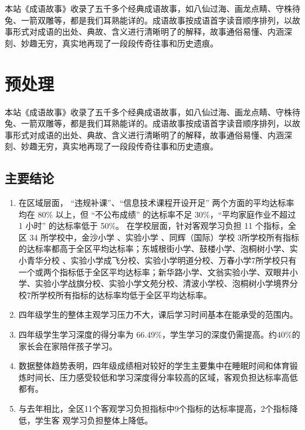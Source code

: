 \documentclass[hyperref, a4paper, UTF8, zihao = -4, linespread = 1]{ctexbook}
\begin{document}
本站《成语故事》收录了五千多个经典成语故事，如八仙过海、画龙点睛、守株待兔、一箭双雕等，都是我们耳熟能详的。成语故事按成语首字读音顺序排列，以故事形式对成语的出处、典故、含义进行清晰明了的解释，故事通俗易懂、内涵深刻、妙趣无穷，真实地再现了一段段传奇往事和历史遗痕。

\hypertarget{preprocess}{%
\chapter{预处理}\label{preprocess}}

本站《成语故事》收录了五千多个经典成语故事，如八仙过海、画龙点睛、守株待兔、一箭双雕等，都是我们耳熟能详的。成语故事按成语首字读音顺序排列，以故事形式对成语的出处、典故、含义进行清晰明了的解释，故事通俗易懂、内涵深刻、妙趣无穷，真实地再现了一段段传奇往事和历史遗痕。

\hypertarget{ux4e3bux8981ux7ed3ux8bba}{%
\section{主要结论}\label{ux4e3bux8981ux7ed3ux8bba}}

\begin{enumerate}
\def\labelenumi{\arabic{enumi}.}
\item
  在区域层面， ``违规补课''、``信息技术课程开设开足'' 两个方面的平均达标率均在 80\% 以上，但 ``不公布成绩'' 的达标率不足 30\%，``平均家庭作业不超过 1 小时'' 的达标率低于 50\%。 在学校层面，针对客观学习负担 11 个指标，全区 34 所学校中，金沙小学 、实验小学 、同辉（国际）学校 3所学校所有指标的达标率都高于全区平均达标率；东城根街小学、鼓楼小学、泡桐树小学、实小青华分校 、实验小学成飞分校、实验小学明道分校、万春小学7所学校只有一个或两个指标低于全区平均达标率；新华路小学、文翁实验小学、双眼井小学、实验小学战旗分校、实验小学文苑分校、清波小学校、泡桐树小学境界分校7所学校所有指标的达标率均低于全区平均达标率。
\item
  四年级学生的整体主观学习压力不大，课后学习时间基本在能承受的范围内。
\item
  四年级学生学习深度的得分率为 66.49\%，学生学习的深度仍需提高。约40\%的家长会在家陪伴孩子学习。
\item
  数据整体趋势表明，四年级成绩相对较好的学生主要集中在睡眠时间和体育锻炼时间长、压力感受较低和学习深度得分率较高的区域，客观负担达标率高低都有。
\item
  与去年相比，全区11个客观学习负担指标中9个指标的达标率提高，2个指标降低，学生客
  观学习负担整体上降低。
\end{enumerate}
\end{document}
